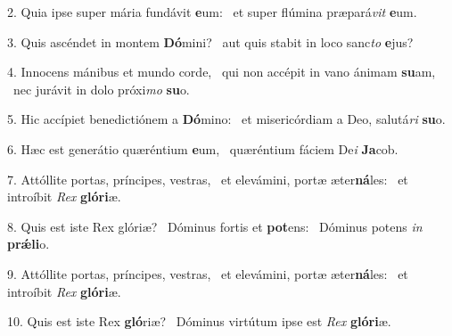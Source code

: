2. Quia ipse super mária fundávit \textbf{e}um: \ast\  et super flúmina præpará\textit{vit} \textbf{e}um.\

3. Quis ascéndet in montem \textbf{Dó}mini? \ast\  aut quis stabit in loco sanc\textit{to} \textbf{e}jus?\

4. Innocens mánibus et mundo corde, \dag\  qui non accépit in vano ánimam \textbf{su}am, \ast\  nec jurávit in dolo próxi\textit{mo} \textbf{su}o.\

5. Hic accípiet benedictiónem a \textbf{Dó}mino: \ast\  et misericórdiam a Deo, salutá\textit{ri} \textbf{su}o.\

6. Hæc est generátio quæréntium \textbf{e}um, \ast\  quæréntium fáciem De\textit{i} \textbf{Ja}cob.\

7. Attóllite portas, príncipes, vestras, \dag\  et elevámini, portæ æter\textbf{ná}les: \ast\  et introíbit \textit{Rex} \textbf{gló}\textbf{ri}æ.\

8. Quis est iste Rex glóriæ? \dag\  Dóminus fortis et \textbf{pot}ens: \ast\  Dóminus potens \textit{in} \textbf{prǽ}\textbf{li}o.\

9. Attóllite portas, príncipes, vestras, \dag\  et elevámini, portæ æter\textbf{ná}les: \ast\  et introíbit \textit{Rex} \textbf{gló}\textbf{ri}æ.\

10. Quis est iste Rex \textbf{gló}riæ? \ast\  Dóminus virtútum ipse est \textit{Rex} \textbf{gló}\textbf{ri}æ.\

